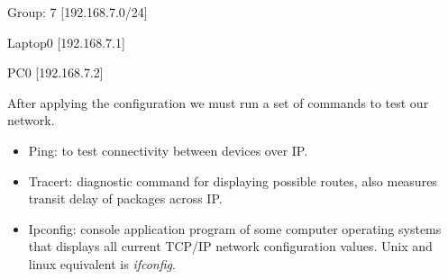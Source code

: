 \documentclass[11pt,a4paper]{report}
\begin{document}
        \begin{compactitem}
            \item Group: 7 [192.168.7.0/24]
            \item Laptop0  [192.168.7.1]
            \item PC0      [192.168.7.2]
        \end{compactitem}

        After applying the configuration we must run a set of commands to test our network.
        \begin{itemize}
            \item Ping: to test connectivity between devices over IP.
            \item Tracert: diagnostic command for displaying possible routes, also measures transit delay of packages across IP.
            \item Ipconfig: console application program of some computer operating systems that displays all current TCP/IP network configuration values. Unix and linux equivalent is \textit{ifconfig}.
        \end{itemize}
\end{document}
